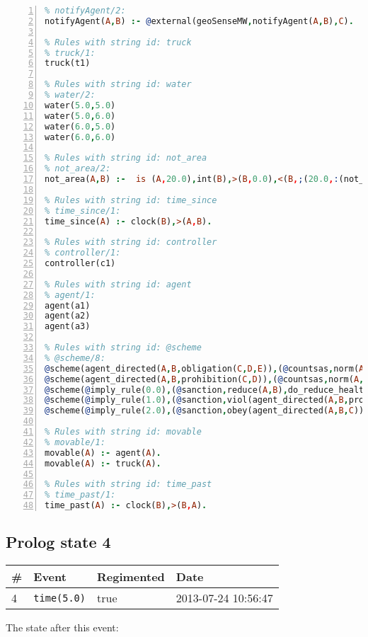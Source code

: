 \documentclass[11pt]{article}\usepackage[utf8]{inputenc}\usepackage{geometry}
\begin{document}
\begin{lstlisting}[language=Prolog, numbers=left]
% Rules with string id: notifyAgent
% notifyAgent/2:
notifyAgent(A,B) :- @external(geoSenseMW,notifyAgent(A,B),C).

% Rules with string id: truck
% truck/1:
truck(t1)

% Rules with string id: water
% water/2:
water(5.0,5.0)
water(5.0,6.0)
water(6.0,5.0)
water(6.0,6.0)

% Rules with string id: not_area
% not_area/2:
not_area(A,B) :-  is (A,20.0),int(B),>(B,0.0),<(B,;(20.0,:(not_area(A,B), is (-(B),20.0)))),int(A),>(A,0.0),<(A,;(20.0,:(area(A,B),-(int(A))))),int(B),>(A,0.0),>(B,0.0),<(A,21.0),<(B,21.0).

% Rules with string id: time_since
% time_since/1:
time_since(A) :- clock(B),>(A,B).

% Rules with string id: controller
% controller/1:
controller(c1)

% Rules with string id: agent
% agent/1:
agent(a1)
agent(a2)
agent(a3)

% Rules with string id: @scheme
% @scheme/8:
@scheme(agent_directed(A,B,obligation(C,D,E)),(@countsas,norm(A,B,F,obligation(C,D,E)),F),false,(listTrue(C)),(time_past(D)),false,[plus(viol(agent_directed(A,B,obligation(C,D,E))))|[]],[plus(obey(agent_directed(A,B,obligation(C,D,E))))|[]])
@scheme(agent_directed(A,B,prohibition(C,D)),(@countsas,norm(A,B,E,prohibition(C,D)),E),(listTrue(C)),false,(false),false,[plus(viol(agent_directed(A,B,prohibition(C,D))))|[]],[plus(obey(agent_directed(A,B,prohibition(C,D))))|[]])
@scheme(@imply_rule(0.0),(@sanction,reduce(A,B),do_reduce_health(A,B),notifyAgent(A,changed(status))),true,false,false,false,[min(reduce(A,B))|[]],[])
@scheme(@imply_rule(1.0),(@sanction,viol(agent_directed(A,B,prohibition(C,D))),do_sanction(D)),true,false,false,false,[min(viol(agent_directed(A,B,prohibition(C,D))))|[]],[])
@scheme(@imply_rule(2.0),(@sanction,obey(agent_directed(A,B,C))),true,false,false,false,[min(obey(agent_directed(A,B,C)))|[]],[])

% Rules with string id: movable
% movable/1:
movable(A) :- agent(A).
movable(A) :- truck(A).

% Rules with string id: time_past
% time_past/1:
time_past(A) :- clock(B),>(B,A).

\end{lstlisting}
\clearpage 
\subsection{Prolog state 4}
\begin{table}[ht]
\centering 
\begin{tabular}{l l l l} 
\textbf{\#} & \textbf{Event} & \textbf{Regimented} & \textbf{Date} \\ [0.5ex] 
\hline
4&\texttt{time(5.0)}&true&2013-07-24 10:56:47\\ [1ex] \hline\end{tabular}
\end{table}
The state after this event:
\end{document}
